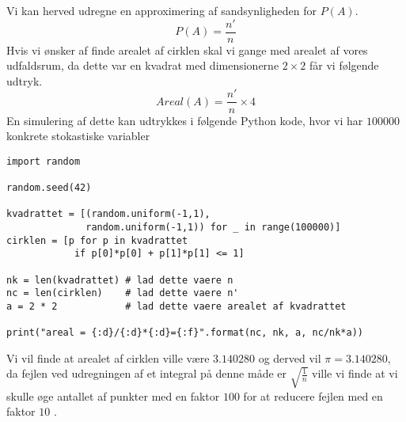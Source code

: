 \documentclass[../../SRP.tex]{subfiles}
\begin{document}
Vi kan herved udregne en approximering af sandsynligheden for $P(A)$.
\begin{equation}
  P(A) = \frac{n'}{n}
\end{equation}
Hvis vi ønsker af finde arealet af cirklen skal vi gange med arealet af vores udfaldsrum, da dette var en kvadrat med dimensionerne $2 \times 2$ får vi følgende udtryk.
\begin{equation}
  Areal(A) = \frac{n'}{n} \times 4
\end{equation}
En simulering af dette kan udtrykkes i følgende Python kode, hvor vi har $100000$ konkrete stokastiske variabler \\

\begin{lstlisting}
import random

random.seed(42)

kvadrattet = [(random.uniform(-1,1), 
              random.uniform(-1,1)) for _ in range(100000)]
cirklen = [p for p in kvadrattet
            if p[0]*p[0] + p[1]*p[1] <= 1]

nk = len(kvadrattet) # lad dette vaere n
nc = len(cirklen)    # lad dette vaere n'
a = 2 * 2            # lad dette vaere arealet af kvadrattet

print("areal = {:d}/{:d}*{:d}={:f}".format(nc, nk, a, nc/nk*a))
\end{lstlisting}
Vi vil finde at arealet af cirklen ville være $3.140280$ og derved vil $\pi = 3.140280$, da fejlen ved udregningen af et integral på denne måde er $\sqrt{\frac{1}{n}}$ ville vi finde at vi skulle øge antallet af punkter med en faktor $100$ for at reducere fejlen med en faktor $10$ \cite{SBM}. \\
\end{document}
